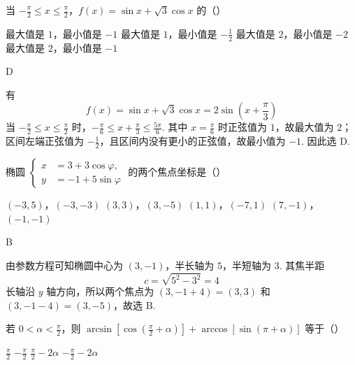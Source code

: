 \begin{problem}
当 \(-\frac{\pi}{2} \leqslant x \leqslant \frac{\pi}{2}\)，\(f(x) = \sin x + \sqrt{3} \cos x\) 的（\quad）

\choices
    {最大值是 \(1\)，最小值是 \(-1\)}
    {最大值是 \(1\)，最小值是 \(-\frac{1}{2} \)}
    {最大值是 \(2\)，最小值是 \(-2\)}
    {最大值是 \(2\)，最小值是 \(-1\)}
\end{problem}

\begin{answer}
D
\end{answer}

\begin{solution}
有
\[
f(x)=\sin x+\sqrt3\cos x=2\sin\left(x+\frac{\pi}{3}\right)
\]
当 \(-\frac{\pi}{2}\leqslant x\leqslant\frac{\pi}{2}\) 时，\(-\frac{\pi}{6}\leqslant x+\frac{\pi}{3}\leqslant\frac{5\pi}{6}\). 其中 \(x=\frac{\pi}{6}\) 时正弦值为 \(1\)，故最大值为 \(2\)；区间左端正弦值为 \(-\frac12\)，且区间内没有更小的正弦值，故最小值为 \(-1\). 因此选 D.
\end{solution}

\begin{problem}
椭圆 \(\begin{cases}
x &= 3 + 3\cos\varphi,\\
y &= -1 + 5\sin\varphi
\end{cases}\) 的两个焦点坐标是（\quad）

\choices
    {\((-3,5)\)，\((-3,-3)\)}
    {\((3,3)\)，\((3,-5)\)}
    {\((1,1)\)，\((-7,1)\)}
    {\((7,-1)\)，\((-1,-1)\)}
\end{problem}

\begin{answer}
B
\end{answer}

\begin{solution}
由参数方程可知椭圆中心为 \((3,-1)\)，半长轴为 \(5\)，半短轴为 \(3\). 其焦半距
\[
c=\sqrt{5^2-3^2}=4
\]
长轴沿 \(y\) 轴方向，所以两个焦点为 \((3,-1+4)=(3,3)\) 和 \((3,-1-4)=(3,-5)\)，故选 B.
\end{solution}

\begin{problem}
若 \(0 < \alpha < \frac{\pi}{2}\)，则 \(\arcsin \left[\cos \left(\frac{\pi}{2} + \alpha\right)\right] + \arccos \left[\sin (\pi + \alpha)\right]\) 等于（\quad）

\choices
    {\(\frac{\pi}{2} \)}
    {\(-\frac{\pi}{2} \)}
    {\(\frac{\pi}{2}-2\alpha \)}
    {\(-\frac{\pi}{2}-2\alpha \)}
\end{problem}

